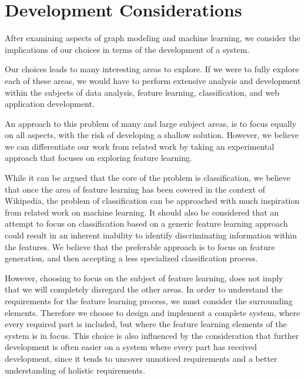 \section{Development Considerations}
After examining aspects of graph modeling and machine learning, we consider the implications of our choices in terms of the development of a system.

Our choices leads to many interesting areas to explore. If we were to fully explore each of these areas, we would have to perform extensive analysis and development within the subjects of data analysis, feature learning, classification, and web application development.

An approach to this problem of many and large subject areas, is to focus equally on all aspects, with the risk of developing a shallow solution. However, we believe we can differentiate our work from related work by taking an experimental approach that focuses on exploring feature learning.


While it can be argued that the core of the problem is classification, we believe that once the area of feature learning has been covered in the context of Wikipedia, the problem of classification can be approached with much inspiration from related work on machine learning. It should also be considered that an attempt to focus on classification based on a generic feature learning approach could result in an inherent inability to identify discriminating information within the features. We believe that the preferable approach is to focus on feature generation, and then accepting a less specialized classification process.

However, choosing to focus on the subject of feature learning, does not imply that we will completely disregard the other areas. In order to understand the requirements for the feature learning process, we must consider the surrounding elements. Therefore we choose to design and implement a complete system, where every required part is included, but where the feature learning elements of the system is in focus. This choice is also influenced by the consideration that further development is often easier on a system where every part has received development, since it tends to uncover unnoticed requirements and a better understanding of holistic requirements.
